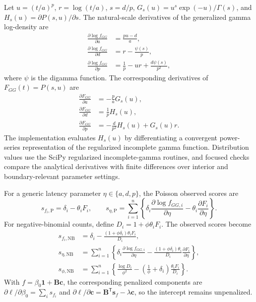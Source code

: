 \documentclass[11pt]{article}
\begin{document}
Let $u=(t/a)^p$, $r=\log(t/a)$, $s=d/p$, $G_s(u)=u^s\exp(-u)/\Gamma(s)$, and $H_s(u)=\partial P(s,u)/\partial s$. The natural-scale derivatives of the generalized gamma log-density are
\begin{equation}
\begin{aligned}
\frac{\partial\log f_{GG}}{\partial a}&=\frac{pu-d}{a},\\
\frac{\partial\log f_{GG}}{\partial d}&=r-\frac{\psi(s)}{p},\\
\frac{\partial\log f_{GG}}{\partial p}&=\frac{1}{p}-ur+\frac{d\psi(s)}{p^2},
\end{aligned}
\label{eq:supp-logdensity-gradient}
\end{equation}
where $\psi$ is the digamma function. The corresponding derivatives of $F_{GG}(t)=P(s,u)$ are
\begin{equation}
\begin{aligned}
\frac{\partial F_{GG}}{\partial a}&=-\frac{p}{a}G_s(u),\\
\frac{\partial F_{GG}}{\partial d}&=\frac{1}{p}H_s(u),\\
\frac{\partial F_{GG}}{\partial p}&=-\frac{d}{p^2}H_s(u)+G_s(u)r.
\end{aligned}
\label{eq:supp-cdf-gradient}
\end{equation}
The implementation evaluates $H_s(u)$ by differentiating a convergent power-series representation of the regularized incomplete gamma function. Distribution values use the SciPy regularized incomplete-gamma routines, and focused checks compare the analytical derivatives with finite differences over interior and boundary-relevant parameter settings.

For a generic latency parameter $\eta\in\{a,d,p\}$, the Poisson observed scores are
\begin{equation}
s_{f_i,\mathrm{P}}=\delta_i-\theta_iF_i,
\qquad
s_{\eta,\mathrm{P}}=
\sum_{i=1}^{n}\left\{
\delta_i\frac{\partial\log f_{GG,i}}{\partial\eta}
-\theta_i\frac{\partial F_i}{\partial\eta}
\right\}.
\label{eq:supp-poisson-score}
\end{equation}
For negative-binomial counts, define $D_i=1+\phi\theta_iF_i$. The observed scores become
\begin{equation}
\begin{aligned}
s_{f_i,\mathrm{NB}}
&=\delta_i-\frac{(1+\phi\delta_i)\theta_iF_i}{D_i},\\
s_{\eta,\mathrm{NB}}
&=\sum_{i=1}^{n}\left\{
\delta_i\frac{\partial\log f_{GG,i}}{\partial\eta}
-\frac{(1+\phi\delta_i)\theta_i}{D_i}
\frac{\partial F_i}{\partial\eta}\right\},\\
s_{\phi,\mathrm{NB}}
&=\sum_{i=1}^{n}\left\{
\frac{\log D_i}{\phi^2}
-\left(\frac{1}{\phi}+\delta_i\right)
\frac{\theta_iF_i}{D_i}\right\}.
\end{aligned}
\label{eq:supp-nb-score}
\end{equation}
With $f=\beta_0\bm{1}+\bm{B}\bm{c}$, the corresponding penalized components are
$\partial\ell/\partial\beta_0=\sum_i s_{f_i}$ and
$\partial\ell/\partial\bm{c}=\bm{B}^{\mathsf T}\bm{s}_f-\lambda\bm{c}$, so the intercept remains
unpenalized.
\end{document}
